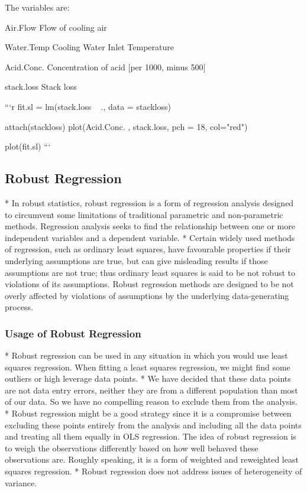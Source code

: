 The variables are: 

\item	Air.Flow	 Flow of cooling air
\item	Water.Temp	 Cooling Water Inlet Temperature
\item	Acid.Conc.	 Concentration of acid [per 1000, minus 500]
\item	stack.loss	 Stack loss



```{r}
fit.sl = lm(stack.loss ~ ., data = stackloss)

attach(stackloss)
plot(Acid.Conc. , stack.loss, pch = 18, col="red")

plot(fit.sl)
```




\subsection*{Robust Regression }

* In robust statistics, robust regression is a form of regression analysis designed to circumvent some 
limitations of traditional parametric and non-parametric methods. Regression analysis seeks to find the 
relationship between one or more independent variables and a dependent variable. 
* Certain widely used methods of regression, such as ordinary least squares, have favourable properties if their
underlying assumptions are true, but can give misleading results if those assumptions are not true; thus
ordinary least squares is said to be not robust to violations of its assumptions. Robust regression methods are designed to be not overly affected by violations of assumptions by the underlying data-generating process.


\subsubsection*{Usage of Robust Regression}

* Robust regression can be used in any situation in which you would use least squares regression. 
When fitting a least squares regression, we might find some outliers or high leverage data points.
* We have decided that these data points are not data entry errors, neither they are from a different population 
than most of our data. So we have no compelling reason to exclude them from the analysis. 
* Robust regression might be a good strategy since it is a compromise between excluding these points entirely from the analysis and including all the data points and treating all them equally in OLS regression. The idea of robust regression is to weigh the observations differently based on how well behaved these observations are. Roughly speaking, it is a form of weighted and reweighted least squares regression.
* Robust regression does not address issues of heterogeneity of variance. 


